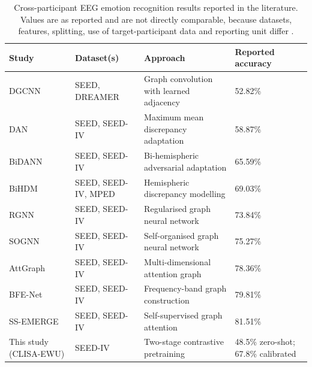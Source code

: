 \begin{table}[!htbp]
  \centering
  {\small\setlength{\tabcolsep}{5pt}
  \begin{tabularx}{\linewidth}{@{}llXl@{}}
  \toprule
\textbf{Study} & \textbf{Dataset(s)} & \textbf{Approach} & \textbf{Reported accuracy} \\
\midrule
DGCNN\cite{dgcnn} & SEED, DREAMER & Graph convolution with learned adjacency & 52.82\% \\
DAN\cite{dan} & SEED, SEED-IV & Maximum mean discrepancy adaptation & 58.87\% \\
BiDANN\cite{bidann} & SEED, SEED-IV & Bi-hemispheric adversarial adaptation & 65.59\% \\
BiHDM\cite{bihdm} & SEED, SEED-IV, MPED & Hemispheric discrepancy modelling & 69.03\% \\
RGNN\cite{rgnn} & SEED, SEED-IV & Regularised graph neural network & 73.84\% \\
SOGNN\cite{sognn} & SEED, SEED-IV & Self-organised graph neural network & 75.27\% \\
AttGraph\cite{attgraph} & SEED, SEED-IV & Multi-dimensional attention graph & 78.36\% \\
BFE-Net\cite{bfenet} & SEED, SEED-IV & Frequency-band graph construction & 79.81\% \\
SS-EMERGE\cite{ssemerge} & SEED, SEED-IV & Self-supervised graph attention & 81.51\% \\
This study (CLISA-EWU) & SEED-IV & Two-stage contrastive pretraining & 48.5\% zero-shot; 67.8\% calibrated \\
  \bottomrule
  \end{tabularx}}
  \caption{Cross-participant EEG emotion recognition results reported in the literature. Values are as reported and are not directly comparable, because datasets, features, splitting, use of target-participant data and reporting unit differ .}
  \label{tab:lit}
\end{table}

